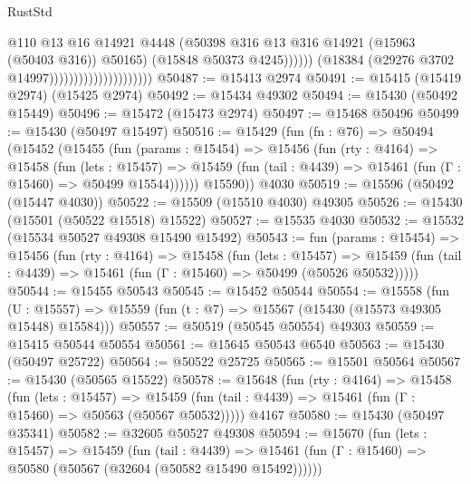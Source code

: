\begin{lexlean}{RustStd}
\begin{coremodule}
{\begin{coremodule}
{{{{{{{{{{{{{{{{{{{{{{{{{{{{{{{{{{{{{{{{{{{{{{{{{{{{{{{{{{{{                                                    @110
                                                    @13
                                                    @16
                                                    @14921
                                                    @4448
                                                    (@50398
                                                      @316
                                                      @13
                                                      @316
                                                      @14921
                                                      (@15963 (@50403 @316))
                                                      @50165)
                                                    (@15848 @50373 @4245))))))
                                          (@18384 (@29276 @3702 @14997)))))))))))))))))))))
@50487 := @15413 @2974
@50491 := @15415 (@15419 @2974) (@15425 @2974)
@50492 := @15434 @49302
@50494 := @15430 (@50492 @15449)
@50496 := @15472 (@15473 @2974)
@50497 := @15468 @50496
@50499 := @15430 (@50497 @15497)
@50516 := @15429
    (fun (fn : @76) =>
    @50494
      (@15452
        (@15455
          (fun (params : @15454) =>
          @15456
            (fun (rty : @4164) =>
            @15458
              (fun (lets : @15457) =>
              @15459 (fun (tail : @4439) => @15461 (fun (Γ : @15460) => @50499 @15544))))))
        @15590))
    @4030
@50519 := @15596 (@50492 (@15447 @4030))
@50522 := @15509 (@15510 @4030) @49305
@50526 := @15430 (@15501 (@50522 @15518) @15522)
@50527 := @15535 @4030
@50532 := @15532 (@15534 @50527 @49308 @15490 @15492)
@50543 := fun (params : @15454) =>
  @15456
    (fun (rty : @4164) =>
    @15458
      (fun (lets : @15457) =>
      @15459 (fun (tail : @4439) => @15461 (fun (Γ : @15460) => @50499 (@50526 @50532)))))
@50544 := @15455 @50543
@50545 := @15452 @50544
@50554 := @15558
    (fun (U : @15557) => @15559 (fun (t : @7) => @15567 (@15430 (@15573 @49305 @15448) @15584)))
@50557 := @50519 (@50545 @50554) @49303
@50559 := @15415 @50544 @50554
@50561 := @15645 @50543 @6540
@50563 := @15430 (@50497 @25722)
@50564 := @50522 @25725
@50565 := @15501 @50564
@50567 := @15430 (@50565 @15522)
@50578 := @15648
    (fun (rty : @4164) =>
    @15458
      (fun (lets : @15457) =>
      @15459 (fun (tail : @4439) => @15461 (fun (Γ : @15460) => @50563 (@50567 @50532)))))
    @4167
@50580 := @15430 (@50497 @35341)
@50582 := @32605 @50527 @49308
@50594 := @15670
    (fun (lets : @15457) =>
    @15459
      (fun (tail : @4439) =>
      @15461 (fun (Γ : @15460) => @50580 (@50567 (@32604 (@50582 @15490 @15492))))))
}}}}}}}}}}}}}}}}}}}}}}}}}}}}}}}}}}}}}}}}}}}}}}}}}}}}}}}}}}}}
\end{coremodule}}
\end{coremodule}
\end{lexlean}
